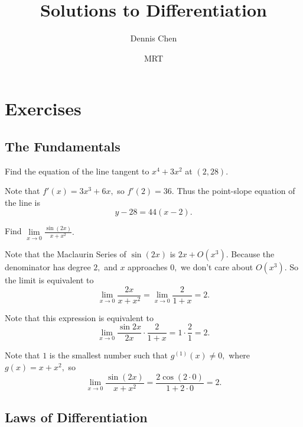 \documentclass{article}
\title{Solutions to Differentiation}
\author{Dennis Chen}
\date{MRT}
\begin{document}
\maketitle

\toc

\pagebreak\section{Exercises}

\subsection{The Fundamentals}

\begin{exer}
Find the equation of the line tangent to $x^4+3x^2$ at $(2,28).$
\end{exer}

\begin{sol}
Note that $f'(x)=3x^3+6x,$ so $f'(2)=36.$ Thus the point-slope equation of the line is
\[y-28=44(x-2).\]
\end{sol}

\begin{exam}
Find $\lim\limits_{x\to 0}\frac{\sin (2x)}{x+x^2}.$
\end{exam}

\begin{sol}
Note that the Maclaurin Series of $\sin(2x)$ is $2x+O(x^3).$ Because the denominator has degree $2,$ and $x$ approaches $0,$ we don't care about $O(x^3).$ So the limit is equivalent to
\[\lim\limits_{x\to 0}\frac{2x}{x+x^2}=\lim\limits_{x\to 0}\frac{2}{1+x}=2.\]
\end{sol}

\begin{sol}[2 (Factoring)]
Note that this expression is equivalent to
\[\lim_{x\to 0}\frac{\sin 2x}{2x}\cdot\frac{2}{1+x}=1\cdot \frac{2}{1}=2.\]
\end{sol}

\begin{sol}[3 (L'Hopital's)]
Note that $1$ is the smallest number such that $g^{(1)}(x)\neq 0,$ where $g(x)=x+x^2,$ so
\[\lim_{x\to 0}\frac{\sin (2x)}{x+x^2}=\frac{2\cos(2\cdot 0)}{1+2\cdot 0}=2.\]
\end{sol}

\subsection{Laws of Differentiation}
\end{document}
